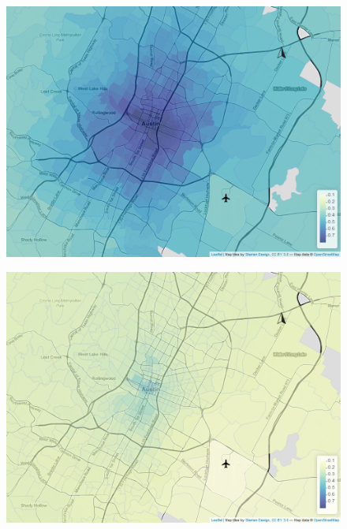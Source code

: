 \begin{figure}[htb]
    \centering
    \begin{minipage}[t]{0.48\linewidth}
        \centering
        \includegraphics[width=\linewidth]{img/tailprob_32_73__9.png}
        \label{fig:wages:appendix2:a}
    \end{minipage}
    \begin{minipage}[t]{0.48\linewidth}
        \centering
        \includegraphics[width=\linewidth]{img/tailprob_32_73__43.png}
        \label{fig:wages:appendix2:b}
    \end{minipage}\hfill
    \begin{minipage}[t]{.48\linewidth}

\end{minipage}
\end{figure}
